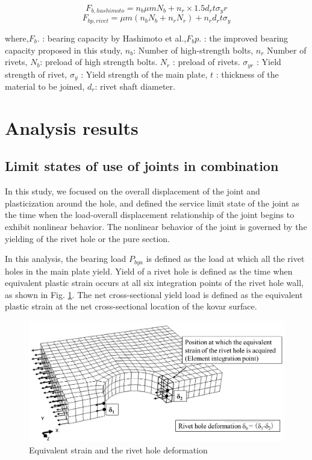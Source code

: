 \begin{equation}\label{eq-fbhashi}
    F_{b,hashimoto}=n_b μmN_b + n_r \times 1.5d_r tσ_yr
\end{equation}
\begin{equation}
    F_{bp,rivet}=μm(n_b N_b+n_r N_r)+n_r d_r tσ_y
\end{equation}

where,$F_b.$ : bearing capacity by Hashimoto et al.,$F_bp$. : the improved bearing capacity proposed in this study, $n_b$: Number of high-strength bolts, $n_r$ Number of rivets, $N_b$: preload of high strength bolts. $N_r$ : preload of rivets. $\sigma_{yr}$ : Yield strength of rivet, $σ_y$ : Yield strength of the main plate, $t$ : thickness of the material to be joined, $d_r$: rivet shaft diameter.

\section{Analysis results}

\subsection{Limit states of use of joints in combination}

In this study, we focused on the overall displacement of the joint and plasticization around the hole, and defined the service limit state of the joint as the time when the load-overall displacement relationship of the joint begins to exhibit nonlinear behavior. The nonlinear behavior of the joint is governed by the yielding of the rivet hole or the pure section.

In this analysis, the bearing load $P_{bya}$ is defined as the load at which all the rivet holes in the main plate yield. Yield of a rivet hole is defined as the time when equivalent plastic strain occurs at all six integration points of the rivet hole wall, as shown in Fig. \ref{fig-posieqqe}. The net cross-sectional yield load is defined as the equivalent plastic strain at the net cross-sectional location of the kovar surface.

\begin{figure}
    \centering
    \includegraphics[width=0.75\linewidth]{imgs//ch4/posi-eqqe.pdf}
    \caption{Equivalent strain and the rivet hole deformation}
    \label{fig-posieqqe}
\end{figure}

